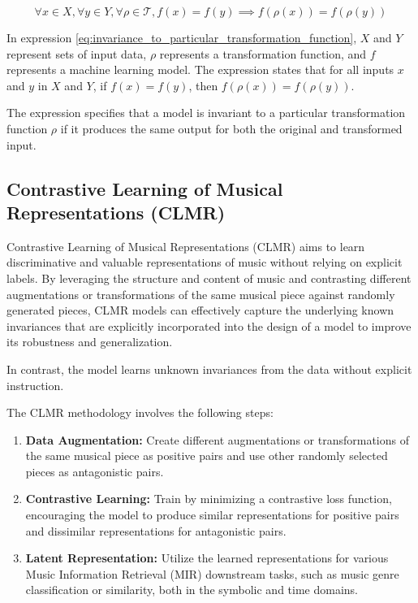 \begin{equation}
\label{eq:invariance_to_particular_transformation_function}
\forall x \in X, \forall y \in Y, \forall \rho \in \mathcal{T}, f(x) = f(y) \implies f(\rho(x)) = f(\rho(y))
\end{equation}

In expression \ref{eq:invariance_to_particular_transformation_function}, $X$ and $Y$ represent sets of input data, $\rho$ represents a transformation function, and $f$ represents a machine learning model. The expression states that for all inputs $x$ and $y$ in $X$ and $Y$, if $f(x) = f(y)$, then $f(\rho(x)) = f(\rho(y))$.

The expression specifies that a model is invariant to a particular transformation function $\rho$ if it produces the same output for both the original and transformed input.

\subsection{Contrastive Learning of Musical Representations (CLMR)}

Contrastive Learning of Musical Representations (CLMR) \cite{CLMR2021} aims to learn discriminative and valuable representations of music without relying on explicit labels. By leveraging the structure and content of music and contrasting different augmentations or transformations of the same musical piece against randomly generated pieces, CLMR models can effectively capture the underlying known invariances that are explicitly incorporated into the design of a model to improve its robustness and generalization.

In contrast, the model learns unknown invariances from the data without explicit instruction.

The CLMR methodology involves the following steps:

\begin{enumerate}
\item \textbf{Data Augmentation:} Create different augmentations or transformations of the same musical piece as positive pairs and use other randomly selected pieces as antagonistic pairs.
\item \textbf{Contrastive Learning:} Train by minimizing a contrastive loss function, encouraging the model to produce similar representations for positive pairs and dissimilar representations for antagonistic pairs.
\item\textbf{Latent Representation:} Utilize the learned representations for various Music Information Retrieval (MIR) downstream tasks, such as music genre classification or similarity, both in the symbolic and time domains.
\end{enumerate}

